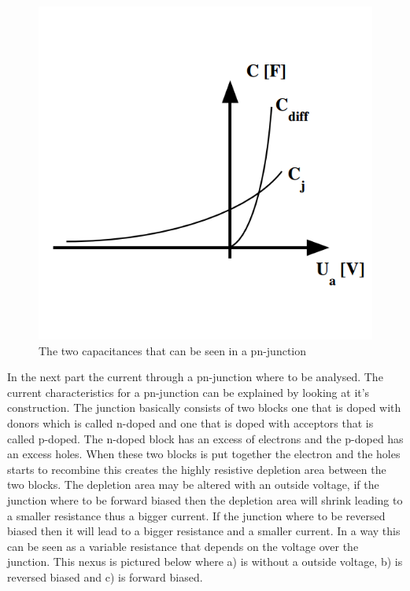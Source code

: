 \documentclass[a4paper]{article}
\begin{document}
\begin{figure}[H]
\centering
\includegraphics[scale=0.3]{capp.png}
\caption{The two capacitances that can be seen in a pn-junction}
\label{capp}
\end{figure}

In the next part the current through a pn-junction where to be analysed. The current characteristics for a pn-junction can be explained by looking at it's construction. The junction basically consists of two blocks one that is doped with donors which is called n-doped and one that is doped with acceptors that is called p-doped. The n-doped block has an excess of electrons and the p-doped has an excess holes. When these two blocks is put together the electron and the holes starts to recombine this creates the highly resistive depletion area between the two blocks. The depletion area may be altered with an outside voltage, if the junction where to be forward biased then the depletion area will shrink leading to a smaller resistance thus a bigger current. If the junction where to be reversed biased then it will lead to a bigger resistance and a smaller current. In a way this can be seen as a variable resistance that depends on the voltage over the junction. This nexus is pictured below where a) is without a outside voltage, b) is reversed biased and c) is forward biased.
\end{document}
